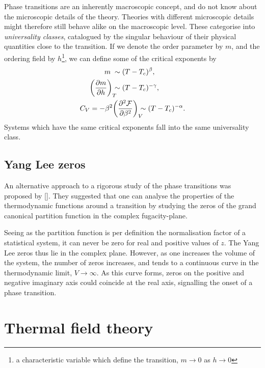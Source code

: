 Phase transitions are an inherently macroscopic concept, and do not know about
the microscopic details of the theory. Theories with different microscopic
details might therefore still behave alike on the macroscopic level. These
categorise into \emph{universality classes}, catalogued by the singular
behaviour of their physical quantities close to the transition. If we denote the
order parameter by $m$, and the ordering field by $h$\footnote{a characteristic
variable which define the transition, $m\to0$ as $h\to0$}, we can define some of
the critical exponents by
%
\begin{align}
  m \;&\sim (T - T_c)^{\beta}, \\
  \bigg(\frac{\partial m}{\partial h}\bigg)_{\mathrlap{T}} &\sim (T - T_c)^{-\gamma}, \\
  C_V = - \beta^2 &\bigg(\frac{\partial^2 \mathcal{F}}{\partial
    \beta^2}\bigg)_{\mathrlap{V}} \sim (T - T_c)^{-\alpha}.
\end{align}
%
Systems which have the same critical exponents fall into the same universality
class. 

\subsection{Yang Lee zeros} \label{sec:yang_lee_zeros_intro}

An alternative approach to a rigorous study of the phase transitions was
proposed by \citeauthor{Yang:1952be} [\citeyear{Yang:1952be,Lee:1952ig}]. They suggested that one
can analyse the properties of the thermodynamic functions around a transition by
studying the zeros of the grand canonical partition function in the complex
fugacity-plane.

Seeing as the partition function is per definition the normalisation factor of a
statistical system, it can never be zero for real and positive values of $z$.
The Yang Lee zeros thus lie in the complex plane.  However, as one increases the
volume of the system, the number of zeros increases, and tends to a continuous
curve in the thermodynamic limit, $V\to\infty$. As this curve forms, zeros on
the positive and negative imaginary axis could coincide at the real axis,
signalling the onset of a phase transition.

\section{Thermal field theory} \label{sec:thermal-field-theory}

